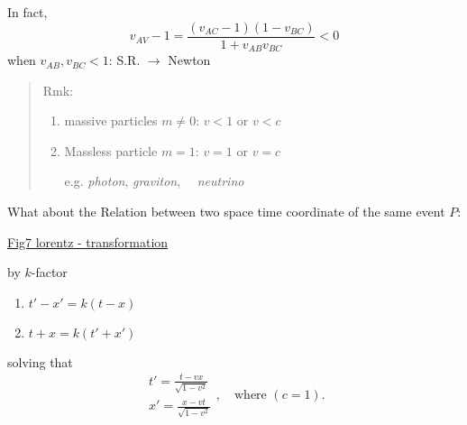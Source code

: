 \documentclass[12pt]{article}
\begin{document}
In fact,
\begin{equation}
v_{AV}-1 = \frac{(v_{AC}-1)(1-v_{BC})}{1+v_{AB}v_{BC}} < 0
\end{equation}
when $v_{AB},v_{BC}<1$: S.R. $\to$ Newton

\begin{quote}
	Rmk:
\begin{enumerate}
	\item massive particles $m\neq 0$: $v<1$ or $v<c$

	\item Massless particle $m=1$: $v=1$ or $v=c$

e.g. \textit{photon}, \textit{graviton}, ~~\textit{neutrino}~~
\end{enumerate}

\end{quote}
What about the Relation between two space time coordinate of the same event $P$:

\underline{Fig7 lorentz - transformation}

by $k$-factor

\begin{enumerate}
	\item $t'-x'=k(t-x)$
	\item $t+x=k(t'+x')$

\end{enumerate}
solving that
\begin{equation}
\begin{aligned}
t' = \frac{t-vx}{\sqrt{1-v^2}}\\
x' = \frac{x-vt}{\sqrt{1-v^2}}
\end{aligned},\quad\text{where $(c=1)$}.
\end{equation}
\end{document}

